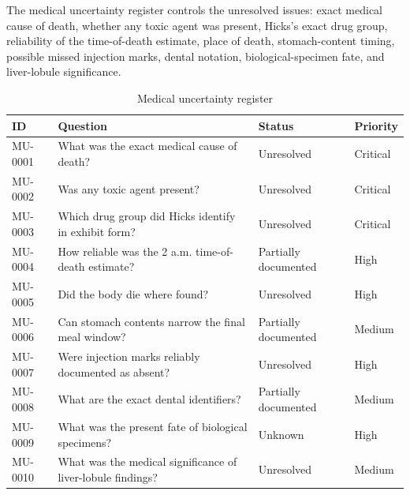 The medical uncertainty register controls the unresolved issues: exact medical cause of death, whether any toxic agent was present, Hicks's exact drug group, reliability of the time-of-death estimate, place of death, stomach-content timing, possible missed injection marks, dental notation, biological-specimen fate, and liver-lobule significance.

\begin{table}[htbp]
\centering
\caption{Medical uncertainty register}
\label{tab:chapter9-medical-uncertainties}
\begin{tabularx}{\textwidth}{>{\raggedright\arraybackslash}p{}>{\raggedright\arraybackslash}p{}>{\raggedright\arraybackslash}p{}>{\raggedright\arraybackslash}X}
\toprule
ID & Question & Status & Priority \\
\midrule
MU-0001 & What was the exact medical cause of death? & Unresolved & Critical \\
MU-0002 & Was any toxic agent present? & Unresolved & Critical \\
MU-0003 & Which drug group did Hicks identify in exhibit form? & Unresolved & Critical \\
MU-0004 & How reliable was the 2 a.m. time-of-death estimate? & Partially documented & High \\
MU-0005 & Did the body die where found? & Unresolved & High \\
MU-0006 & Can stomach contents narrow the final meal window? & Partially documented & Medium \\
MU-0007 & Were injection marks reliably documented as absent? & Unresolved & High \\
MU-0008 & What are the exact dental identifiers? & Partially documented & Medium \\
MU-0009 & What was the present fate of biological specimens? & Unknown & High \\
MU-0010 & What was the medical significance of liver-lobule findings? & Unresolved & Medium \\
\bottomrule
\end{tabularx}
\end{table}

